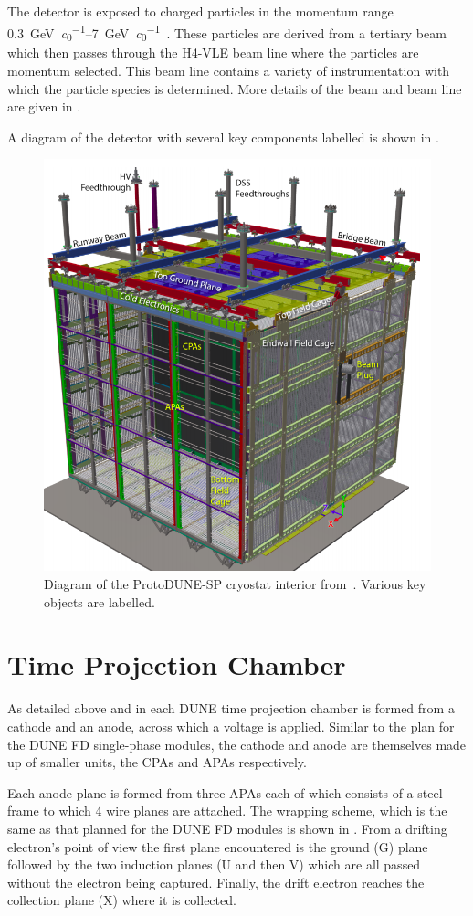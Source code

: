 The detector is exposed to charged particles in the momentum range \SIrange{0.3}{7}{\GeV\per\clight}~\cite{protodunePerformance}.
These particles are derived from a tertiary beam which then passes through the H4-VLE beam line where the particles are momentum selected.
This beam line contains a variety of instrumentation with which the particle species is determined.
More details of the beam and beam line are given in .

A diagram of the detector with several key components labelled is shown in .

\begin{figure}[h]
	\centering
	\includegraphics[width=.6\linewidth]{files/figures/protodune_detector/pdspDiag}
	\caption[Captioned diagram of the ProtoDUNE-SP cryostat interior]{Diagram of the ProtoDUNE-SP cryostat interior from~\cite{protodunePerformance}. Various key objects are labelled.}
	\label{fig:pdspDiag}
\end{figure}


\section{Time Projection Chamber}
\label{sec:protodune:tpc}

As detailed above and in  each DUNE time projection chamber is formed from a cathode and an anode, across which a voltage is applied.
Similar to the plan for the DUNE FD single-phase modules, the cathode and anode are themselves made up of smaller units, the CPAs and APAs respectively.

Each anode plane is formed from three APAs each of which consists of a steel frame to which 4 wire planes are attached.
The wrapping scheme, which is the same as that planned for the DUNE FD modules is shown in .
From a drifting electron's point of view the first plane encountered is the ground (G) plane followed by the two induction planes (U and then V) which are all passed without the electron being captured.
Finally, the drift electron reaches the collection plane (X) where it is collected.

